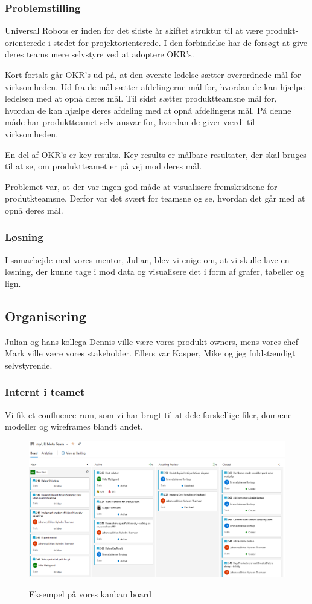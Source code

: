 \documentclass[a4paper]{article}
\begin{document}
\subsubsection{Problemstilling}
Universal Robots er inden for det sidste år skiftet struktur til at være 
produkt-orienterede i stedet for projektorienterede.
I den forbindelse har de forsøgt at give deres teams mere selvstyre ved at 
adoptere OKR's.

Kort fortalt går OKR's ud på, 
at den øverste ledelse sætter overordnede mål for virksomheden.
Ud fra de mål sætter afdelingerne mål for,
hvordan de kan hjælpe ledelsen med at opnå deres mål.
Til sidst sætter produktteamsne mål for, 
hvordan de kan hjælpe deres afdeling med at opnå afdelingens mål.
På denne måde har produktteamet selv ansvar for,
hvordan de giver værdi til virksomheden.

En del af OKR's er key results. 
Key results er målbare resultater, der skal bruges til at se,
om produktteamet er på vej mod deres mål.

Problemet var, at der var ingen god måde at visualisere 
fremskridtene for produtkteamsne.
Derfor var det svært for teamsne og se, hvordan det går med at opnå deres mål.

\subsubsection{Løsning}
I samarbejde med vores mentor, Julian, blev vi enige om, at vi skulle lave en 
løsning, der kunne tage i mod data og visualisere det i form af 
grafer, tabeller og lign.

\subsection{Organisering}
Julian og hans kollega Dennis ville være vores produkt owners,
mens vores chef Mark ville være vores stakeholder.
Ellers var Kasper, Mike og jeg fuldstændigt selvstyrende.

\subsubsection{Internt i teamet}
Vi fik et confluence rum, som vi har brugt til at dele forskellige filer, 
domæne modeller og wireframes blandt andet.

\begin{figure}[h!]
    \includegraphics[width=\linewidth]{kanbanboard.png}
    \centering
    \label{kanban}
    \caption{Eksempel på vores kanban board}
\end{figure}
\end{document}
